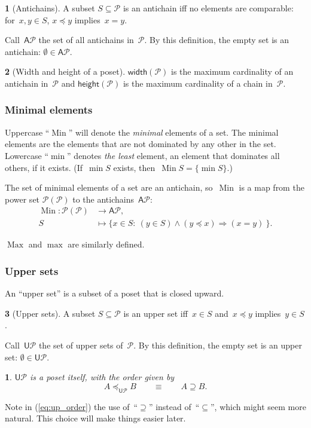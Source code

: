\documentclass[twocolumn,english]{IEEEtran}
\theoremstyle{definition}
\newtheorem{defn}{\protect\definitionname}
\theoremstyle{plain}
\newtheorem{lem}{\protect\lemmaname}
\theoremstyle{definition}
\theoremstyle{remark}
\theoremstyle{definition}
\theoremstyle{plain}
\theoremstyle{plain}
\newcommand{\aword}[1]{\mathsf{#1}}
\newcommand{\vmath}[1]{\aword{#1}}
\newcommand{\pset}{\mathscr{P}}
\DeclareMathOperator*{\Min}{Min}
\DeclareMathOperator*{\Max}{Max}
\newcommand{\posleq}{\preceq}
\newcommand{\posA}{\mathcal{P}}
\newcommand{\antichains}{\vmath{A}}
\newcommand{\upsets}{\vmath{U}}
\providecommand{\definitionname}{Definition}
\providecommand{\lemmaname}{Lemma}
\begin{document}
\begin{defn}[Antichains]
A subset $S\subseteq\posA$ is an antichain iff no elements are comparable:
for~$x,y\in S$, $x\posleq y$ implies~$x=y$. 
\end{defn}
Call~$\antichains\posA$ the set of all antichains in~$\posA$.
By this definition, the empty set is an antichain: $\emptyset\in\antichains\posA$.

\begin{defn}[Width and height of a poset]
\label{def:poset-width-height} $\mathsf{width}(\posA)$ is the maximum
cardinality of an antichain in~$\posA$ and $\mathsf{height}(\posA)$
is the maximum cardinality of a chain in~$\posA$.
\end{defn}


\subsubsection*{Minimal elements}

Uppercase ``$\Min$'' will denote the \emph{minimal} elements of
a set. The minimal elements are the elements that are not dominated
by any other in the set. Lowercase ``$\min$'' denotes\emph{ the
least} element, an element that dominates all others, if it exists.
(If~$\min S$ exists, then~$\Min S=\{\min S\}$.)   

The set of minimal elements of a set are an antichain, so~$\Min$
is a map from the power set $\pset(\posA)$ to the antichains~$\antichains\posA$:
\begin{align*}
\Min\colon\pset(\posA) & \rightarrow\antichains\posA,\\
S & \mapsto\{x\in S:\ (y\in S)\wedge(y\posleq x)\Rightarrow(x=y)\ \}.
\end{align*}

$\Max$ and $\max$ are similarly defined.

\subsubsection*{Upper sets}

An ``upper set'' is a subset of a poset that is closed upward.

\begin{defn}[Upper sets]
A subset $S\subseteq\posA$ is an upper set iff~$x\in S$ and~$x\posleq y$
implies~$y\in S$. 
\end{defn}
Call~$\upsets\posA$ the set of upper sets of~$\posA$. By this
definition, the empty set is an upper set: $\emptyset\in\upsets\posA$.
\begin{lem}
$\upsets\posA$ is a poset itself, with the order given by 
\begin{equation}
A\posleq_{\upsets\posA}B\qquad\equiv\qquad A\supseteq B.\label{eq:up_order}
\end{equation}
\end{lem}
Note in (\ref{eq:up_order}) the use of~``$\supseteq$'' instead
of~``$\subseteq$'', which might seem more natural. This choice
will make things easier later. 
\end{document}
